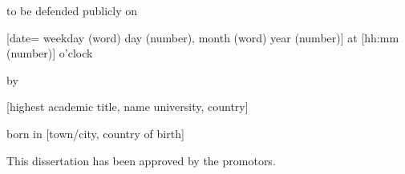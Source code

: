 \begin{titlepage}
\begin{center}
        to be defended publicly on

            [date= weekday (word) day (number), month (word) year (number)] at [hh:mm (number)] o'clock

        \bigskip
        \bigskip

        by

        \bigskip
        \bigskip

        \makeatletter
        \makeatother

        \bigskip
        \bigskip

        [highest academic title, name university, country]

        born in [town/city, country of birth]

        \vspace*{2\bigskipamount}

    \end{center}

    \clearpage
    \thispagestyle{empty}

    \noindent This dissertation has been approved by the promotors.


\end{titlepage}
